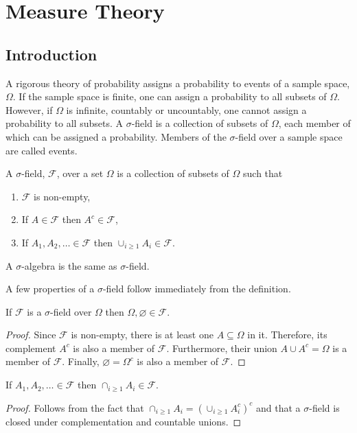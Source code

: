 \chapter{Measure Theory}\label{c1}
\section{Introduction}\label{c1s1}
A rigorous theory of probability assigns a probability to events of a sample
space, $\Omega$. If the sample space is finite, one can assign a probability to 
all subsets of $\Omega$. However, if $\Omega$ is infinite, countably or 
uncountably, one cannot assign a probability to all subsets. A $\sigma$-field
is a collection of subsets of $\Omega$, each member of which can be assigned a
probability. Members of the $\sigma$-field over a sample space are called 
events.

\begin{defn}\label{c1s1d1}
A $\sigma$-field, $\mathcal{F}$, over a set $\Omega$ is a collection of subsets 
of $\Omega$ such that
\begin{enumerate}
\item $\mathcal{F}$ is non-empty,
\item If $A \in \mathcal{F}$ then $A^c \in \mathcal{F}$,
\item If $A_1, A_2, \ldots \in \mathcal{F}$ then $\cup_{i \ge 1}A_i \in
\mathcal{F}$.
\end{enumerate}
\end{defn}

\begin{rem}
A $\sigma$-algebra is the same as $\sigma$-field.
\end{rem}

A few properties of a $\sigma$-field follow immediately from the definition.
\begin{prop}\label{c1s1p1}
If $\mathcal{F}$ is a $\sigma$-field over $\Omega$ then $\Omega, \varnothing
\in \mathcal{F}$.
\end{prop}
\begin{proof}
Since $\mathcal{F}$ is non-empty, there is at least one $A \subseteq \Omega$
in it. Therefore, its complement $A^c$ is also a member of $\mathcal{F}$.
Furthermore, their union $A \cup A^c = \Omega$ is a member of $\mathcal{F}$.
Finally, $\varnothing = \Omega^c$ is also a member of $\mathcal{F}$.
\end{proof}

\begin{prop}\label{c1s1p2}
If $A_1, A_2, \ldots \in \mathcal{F}$ then $\cap_{i \ge 1}A_i \in \mathcal{F}$.
\end{prop}
\begin{proof}
Follows from the fact that
$
\cap_{i \ge 1}A_i = \left(\cup_{i \ge 1}A_i^c\right)^c
$
and that a $\sigma$-field is closed under complementation and countable unions.
\end{proof}

